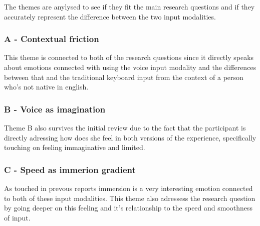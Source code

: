 The themes are anylysed to see if they fit the main research questions and if they accurately represent the difference between the two input modalities.

\subsubsection{A - Contextual friction}

This theme is connected to both of the research questions since it directly speaks about emotions connected with using the voice input modality and the differences between that and the traditional keyboard input from the context of a person who's not native in english.



\subsubsection{B - Voice as imagination}

Theme B also survives the initial review due to the fact that the participant is directly adressing how does she feel in both versions of the experience, specifically touching on feeling immaginative and limited. 



\subsubsection{C - Speed as immerion gradient}

As touched in prevous reports immersion is a very interesting emotion connected to both of these input modalities. This theme also adressess the research question by going deeper on this feeling and it's relationship to the speed and smoothness of input. 


